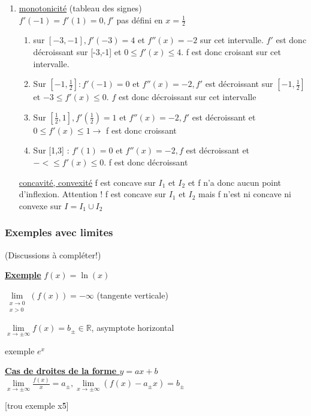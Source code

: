 \documentclass[12pt,a4paper]{article}
\newcommand{\limite}{\lim\limits_}
\newcommand{\llimite}[3]{\limite{\substack{#1 \\ #2}}\left(#3\right)}
\newcommand{\evid}[1]{\textbf{\underline{#1}}}
\newcommand{\R}{\ensuremath{\mathbb{R}} }
\begin{document}
{\begin{enumerate}
	 valeurs aux bords : $f(-3) = -1, f(3) = -3$\\
	 $M = \max\{-1,-3,1,3\} = 3$\\
	 $m=\min\{-1,-3,\frac{3}{4}\} = -3$\\
	 d'où $\Im(f) = [-3,3]$.
	 \item \underline{monotonicité} (tableau des signes)\\
	 $f'(-1) = f'(1) = 0, f'$ pas défini en $x=\frac{1}{2}$
	 \begin{enumerate}[label=\roman*)]
	 	\item sur $[-3,-1], f'(-3) = 4$ et $f''(x) =-2$ sur cet intervalle. $f'$ est donc décroissant  sur [-3,-1] et $0 \leq f'(x) \leq 4$. f est donc croisant sur cet intervalle. 
	 	\item Sur $[-1,\frac{1}{2}] : f'(-1) = 0$ et $f''(x) = -2, f'$ est décroissant sur $[-1,\frac{1}{2}]$ et $-3 \leq f'(x) \leq 0$. $f$ est donc décroissant sur cet intervalle
	 	\item Sur $[\frac{1}{2},1], f'(\frac{1}{2}) = 1$ et $f''(x) = -2, f'$ est décroissant et $0\leq f'(x) \leq 1 \to$ f est donc croissant
	 	\item Sur [1,3] : $f'(1) = 0$ et $f''(x) = -2, f$ est décroissant et $-<\leq f'(x)\leq 0$. f est donc décroissant
	 \end{enumerate}
	 \underline{concavité, convexité} f est concave sur $I_1$ et $I_2$ et f n'a donc aucun point d'inflexion. Attention ! f est concave sur $I_1$ et $I_2$ mais f n'est ni concave ni convexe sur $I = I_1 \cup I_2$
\end{enumerate}

\subsubsection{Exemples avec limites}
(Discussions à compléter!)

\evid{Exemple} $f(x) = \ln(x)$
\begin{boite}[0.5]
 $\llimite{x\to 0}{x > 0}{f(x)} = -\infty$ (tangente verticale)
\end{boite}
\begin{boite}[0.6]
	$\limite{x\to \pm \infty} f(x) = b_{\pm} \in \R$, asymptote horizontal
\end{boite}
exemple $e^x$
\begin{boite}
	\evid{Cas de droites de la forme $y = ax+b$}\\
	$\limite{x\to\pm\infty} \frac{f(x)}{x} = a_{\pm}, \limite{x\to\pm\infty} (f(x)-a_{\pm}x) = b_{\pm}$
\end{boite}
[trou exemple x\^5]

}
\end{document}
